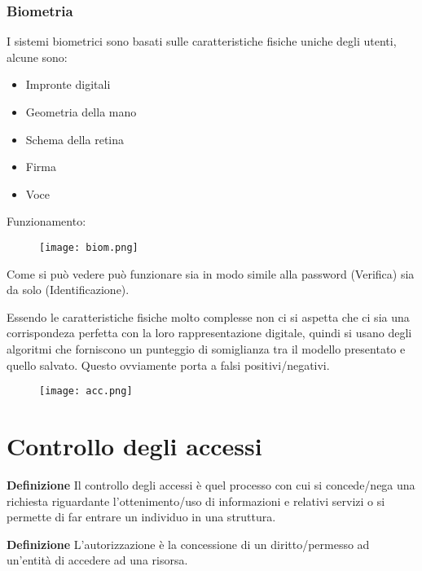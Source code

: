 \documentclass{article}
\newcommand{\df}[1]{\noindent\textbf{Definizione } #1.\newline}
\begin{document}
\subsubsection{Biometria}

I sistemi biometrici sono basati sulle caratteristiche fisiche uniche degli utenti, alcune sono:
\begin{itemize}
    \item Impronte digitali
    \item Geometria della mano
    \item Schema della retina
    \item Firma
    \item Voce
\end{itemize}

\newpage

\noindent Funzionamento:

\begin{figure}[ht]
    \centering
    \texttt{[image: biom.png]}
\end{figure}

\noindent Come si può vedere può funzionare sia in modo simile alla password (Verifica) sia da solo (Identificazione).\newline

\noindent Essendo le caratteristiche fisiche molto complesse non ci si aspetta che ci sia una corrispondeza perfetta con la loro rappresentazione digitale, quindi si usano degli algoritmi che forniscono un punteggio di somiglianza tra il modello presentato e quello salvato. Questo ovviamente porta a falsi positivi/negativi.\newline

\begin{figure}[ht]
    \centering
    \texttt{[image: acc.png]}
\end{figure}

\section{Controllo degli accessi}

\df{Il controllo degli accessi è quel processo con cui si concede/nega una richiesta riguardante l'ottenimento/uso di informazioni e relativi servizi o si permette di far entrare un individuo in una struttura}

\df{L'autorizzazione è la concessione di un diritto/permesso ad un'entità di accedere ad una risorsa}
\end{document}
